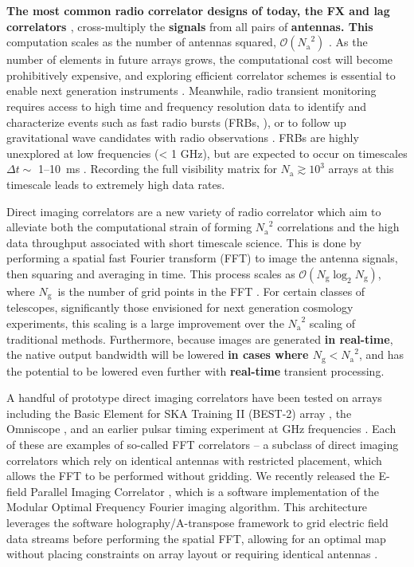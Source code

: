 \documentclass[a4paper,fleqn,usenatbib]{../mnras}
\newcommand{\Nant}{\ensuremath{N_{\mathrm{a}}}}
\newcommand{\Ng}{\ensuremath{N_{\mathrm{g}}}}
\begin{document}
\textbf{The most common radio correlator designs of today, the FX and lag correlators \citep{rom99}},
cross-multiply the \textbf{signals} from all pairs of \textbf{antennas.
This} computation scales as the number of antennas squared, $\mathcal{O}(\Nant^2)$ 
\citep{bun04}. As the number of elements in future arrays grows, the computational cost will 
become prohibitively expensive, and exploring efficient correlator schemes is essential to 
enable next generation instruments \citep{lon00}. Meanwhile, radio transient monitoring 
requires access to high time and frequency resolution data to identify and characterize events 
such as fast radio bursts (FRBs, \citealt{lor07}), or to follow up gravitational wave candidates 
with radio observations \citep{abb16a,abb16b}. FRBs are highly unexplored at low frequencies 
(< 1 GHz), but are expected to occur on timescales $\Delta t \sim$ 1--10~ms \citep{tho13}. 
Recording the full visibility matrix for $\Nant \gtrsim 10^3$ arrays at this timescale leads to 
extremely high data rates. 

Direct imaging correlators are a new variety of radio correlator which aim to alleviate both the 
computational strain of forming $\Nant^2$ correlations and the high data throughput associated 
with short timescale science. This is done by performing a spatial fast Fourier transform (FFT) 
to image the antenna signals, then squaring and averaging in time. This process scales as 
$\mathcal{O}(\Ng \log_2 \Ng)$, where \Ng~is the number of grid points in the FFT \citep{mor11,
 teg09, teg10}. For certain classes of telescopes, significantly those envisioned for next 
 generation cosmology experiments, this scaling is a large improvement over the $\Nant^2$ 
 scaling of traditional methods. Furthermore, because images are generated \textbf{in real-time}, the native 
 output bandwidth will be lowered \textbf{in cases where $\Ng < \Nant^2$}, and has the potential to be 
 lowered even further with \textbf{real-time} transient processing.

A handful of prototype direct imaging correlators have been tested on arrays including the 
Basic Element for SKA Training II (BEST-2) array \citep{fos14}, the Omniscope \citep{zhe14}, 
and an earlier pulsar timing experiment at GHz frequencies \citep{oto94, dai00}. Each of these 
are examples of so-called FFT correlators -- a subclass of direct imaging correlators which rely 
on identical antennas with restricted placement, which allows the FFT to be performed without 
gridding. We recently released the E-field Parallel Imaging Correlator \citep[EPIC;][]{thy15c}, 
which is a software implementation of the Modular Optimal Frequency Fourier \citep[MOFF;][]
{mor11} imaging algorithm. This architecture leverages the software holography/A-transpose 
framework to grid electric field data streams before performing the spatial FFT, allowing for an 
optimal map without placing constraints on array layout or requiring identical antennas 
\citep{mor09,bha08,teg97a}.
\end{document}

